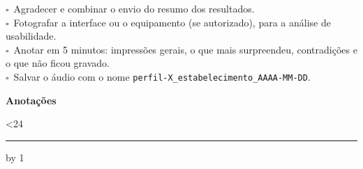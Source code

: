 \documentclass[11pt,a4paper]{article}
\newcommand{\caixa}{$\square$\ }
\begin{document}
\begin{tcolorbox}[colback=gray!6,colframe=gray!50,title=Logo depois da entrevista,fonttitle=\bfseries]
\caixa Agradecer e combinar o envio do resumo dos resultados.\\
\caixa Fotografar a interface ou o equipamento (se autorizado), para a análise de usabilidade.\\
\caixa Anotar em 5 minutos: impressões gerais, o que mais surpreendeu, contradições e o que não ficou gravado.\\
\caixa Salvar o áudio com o nome \texttt{perfil-X\_estabelecimento\_AAAA-MM-DD}.
\end{tcolorbox}

\newpage
\textbf{Anotações}\par
\vspace{0.5em}
\newcount\linhas {}
\loop\ifnum\linhas<24 \rule{\linewidth}{0.3pt}\par\vspace{0.7em}\advance\linhas by 1 \repeat
\end{document}
